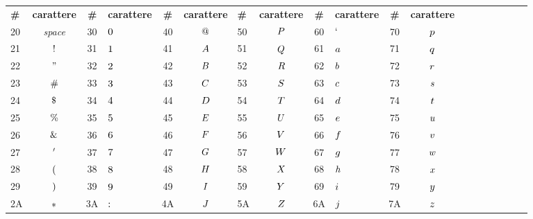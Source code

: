 \documentclass[../main.tex]{subfiles}
\begin{document}
\noindent
\begin{table}[h!]
    \centering
    
    \setlength{\tabcolsep}{4pt}
    \renewcommand{\arraystretch}{1.5}

    \begin{tabular}{ V{4} c | c V{4} c | c V{4} c | c V{4} c | c V{4} c | c V{4} c | c V{4} }
        \textbf{\#} & \textbf{carattere} & \textbf{\#} & \textbf{carattere} & \textbf{\#} & \textbf{carattere} & \textbf{\#} & \textbf{carattere} & \textbf{\#} & \textbf{carattere} & \textbf{\#} & \textbf{carattere} \\
        20 & \textit{space} & 30 & $\char"30$ & 40 & $\char"40$ & 50 & $\char"50$ & 60 & $\char"60$ & 70 & $\char"70$ \\
         & $\char"21$ & 31 & $\char"31$ & 41 & $\char"41$ & 51 & $\char"51$ & 61 & $\char"61$ & 71 & $\char"71$ \\
         & $\char"22$ & 32 & $\char"32$ & 42 & $\char"42$ & 52 & $\char"52$ & 62 & $\char"62$ & 72 & $\char"72$ \\
         & $\char"23$ & 33 & $\char"33$ & 43 & $\char"43$ & 53 & $\char"53$ & 63 & $\char"63$ & 73 & $\char"73$ \\
         & $\char"24$ & 34 & $\char"34$ & 44 & $\char"44$ & 54 & $\char"54$ & 64 & $\char"64$ & 74 & $\char"74$ \\
         & $\char"25$ & 35 & $\char"35$ & 45 & $\char"45$ & 55 & $\char"55$ & 65 & $\char"65$ & 75 & $\char"75$ \\
         & $\char"26$ & 36 & $\char"36$ & 46 & $\char"46$ & 56 & $\char"56$ & 66 & $\char"66$ & 76 & $\char"76$ \\
         & $\char"27$ & 37 & $\char"37$ & 47 & $\char"47$ & 57 & $\char"57$ & 67 & $\char"67$ & 77 & $\char"77$ \\
         & $\char"28$ & 38 & $\char"38$ & 48 & $\char"48$ & 58 & $\char"58$ & 68 & $\char"68$ & 78 & $\char"78$ \\
         & $\char"29$ & 39 & $\char"39$ & 49 & $\char"49$ & 59 & $\char"59$ & 69 & $\char"69$ & 79 & $\char"79$ \\
        \hline
        2A & $\char"2A$ & 3A & $\char"3A$ & 4A & $\char"4A$ & 5A & $\char"5A$ & 6A & $\char"6A$ & 7A & $\char"7A$ \\

\end{tabular}
\end{table}
\end{document}
